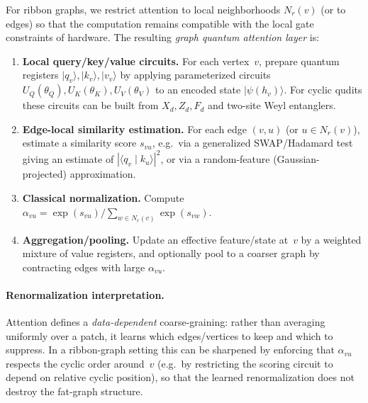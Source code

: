 \documentclass[11pt,oneside]{amsbook}
\numberwithin{equation}{section}
\theoremstyle{plain}
\theoremstyle{definition}
\theoremstyle{remark}
\newcommand{\ket}[1]{\lvert #1 \rangle}
\begin{document}
For ribbon graphs, we restrict attention to local neighborhoods $N_r(v)$ (or to edges) so that the
computation remains compatible with the local gate constraints of hardware.
The resulting \emph{graph quantum attention layer} is:
\begin{enumerate}
\item \textbf{Local query/key/value circuits.} For each vertex~$v$, prepare quantum registers
$\ket{q_v},\ket{k_v},\ket{v_v}$ by applying parameterized circuits
$U_Q(\theta_Q),U_K(\theta_K),U_V(\theta_V)$ to an encoded state $\ket{\psi(h_v)}$.
For cyclic qudits these circuits can be built from $X_d,Z_d,F_d$ and two-site Weyl entanglers.
\item \textbf{Edge-local similarity estimation.} For each edge $(v,u)$ (or $u\in N_r(v)$),
estimate a similarity score $s_{vu}$, e.g.\ via a generalized SWAP/Hadamard test giving an estimate
of $|\langle q_v\mid k_u\rangle|^2$, or via a random-feature (Gaussian-projected) approximation.
\item \textbf{Classical normalization.} Compute $\alpha_{vu} = \exp(s_{vu})/\sum_{w\in N_r(v)}\exp(s_{vw})$.
\item \textbf{Aggregation/pooling.} Update an effective feature/state at~$v$ by a weighted mixture of
value registers, and optionally pool to a coarser graph by contracting edges with large $\alpha_{vu}$.
\end{enumerate}

\paragraph{Renormalization interpretation.}
Attention defines a \emph{data-dependent} coarse-graining: rather than averaging uniformly over a
patch, it learns which edges/vertices to keep and which to suppress. In a ribbon-graph setting this
can be sharpened by enforcing that $\alpha_{vu}$ respects the cyclic order around~$v$ (e.g.\ by
restricting the scoring circuit to depend on relative cyclic position), so that the learned
renormalization does not destroy the fat-graph structure.
\end{document}
